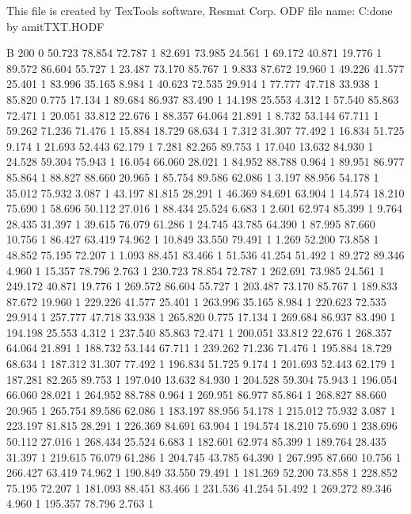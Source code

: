 This file is created by TexTools software, Resmat Corp.
ODF file name: C:\Users\Intel\Desktop\Texture done by amit\Sol TXT\solodf.HODF

B 200 0
	50.723	78.854	72.787	1
	82.691	73.985	24.561	1
	69.172	40.871	19.776	1
	89.572	86.604	55.727	1
	23.487	73.170	85.767	1
	9.833	87.672	19.960	1
	49.226	41.577	25.401	1
	83.996	35.165	8.984	1
	40.623	72.535	29.914	1
	77.777	47.718	33.938	1
	85.820	0.775	17.134	1
	89.684	86.937	83.490	1
	14.198	25.553	4.312	1
	57.540	85.863	72.471	1
	20.051	33.812	22.676	1
	88.357	64.064	21.891	1
	8.732	53.144	67.711	1
	59.262	71.236	71.476	1
	15.884	18.729	68.634	1
	7.312	31.307	77.492	1
	16.834	51.725	9.174	1
	21.693	52.443	62.179	1
	7.281	82.265	89.753	1
	17.040	13.632	84.930	1
	24.528	59.304	75.943	1
	16.054	66.060	28.021	1
	84.952	88.788	0.964	1
	89.951	86.977	85.864	1
	88.827	88.660	20.965	1
	85.754	89.586	62.086	1
	3.197	88.956	54.178	1
	35.012	75.932	3.087	1
	43.197	81.815	28.291	1
	46.369	84.691	63.904	1
	14.574	18.210	75.690	1
	58.696	50.112	27.016	1
	88.434	25.524	6.683	1
	2.601	62.974	85.399	1
	9.764	28.435	31.397	1
	39.615	76.079	61.286	1
	24.745	43.785	64.390	1
	87.995	87.660	10.756	1
	86.427	63.419	74.962	1
	10.849	33.550	79.491	1
	1.269	52.200	73.858	1
	48.852	75.195	72.207	1
	1.093	88.451	83.466	1
	51.536	41.254	51.492	1
	89.272	89.346	4.960	1
	15.357	78.796	2.763	1
	230.723	78.854	72.787	1
	262.691	73.985	24.561	1
	249.172	40.871	19.776	1
	269.572	86.604	55.727	1
	203.487	73.170	85.767	1
	189.833	87.672	19.960	1
	229.226	41.577	25.401	1
	263.996	35.165	8.984	1
	220.623	72.535	29.914	1
	257.777	47.718	33.938	1
	265.820	0.775	17.134	1
	269.684	86.937	83.490	1
	194.198	25.553	4.312	1
	237.540	85.863	72.471	1
	200.051	33.812	22.676	1
	268.357	64.064	21.891	1
	188.732	53.144	67.711	1
	239.262	71.236	71.476	1
	195.884	18.729	68.634	1
	187.312	31.307	77.492	1
	196.834	51.725	9.174	1
	201.693	52.443	62.179	1
	187.281	82.265	89.753	1
	197.040	13.632	84.930	1
	204.528	59.304	75.943	1
	196.054	66.060	28.021	1
	264.952	88.788	0.964	1
	269.951	86.977	85.864	1
	268.827	88.660	20.965	1
	265.754	89.586	62.086	1
	183.197	88.956	54.178	1
	215.012	75.932	3.087	1
	223.197	81.815	28.291	1
	226.369	84.691	63.904	1
	194.574	18.210	75.690	1
	238.696	50.112	27.016	1
	268.434	25.524	6.683	1
	182.601	62.974	85.399	1
	189.764	28.435	31.397	1
	219.615	76.079	61.286	1
	204.745	43.785	64.390	1
	267.995	87.660	10.756	1
	266.427	63.419	74.962	1
	190.849	33.550	79.491	1
	181.269	52.200	73.858	1
	228.852	75.195	72.207	1
	181.093	88.451	83.466	1
	231.536	41.254	51.492	1
	269.272	89.346	4.960	1
	195.357	78.796	2.763	1
